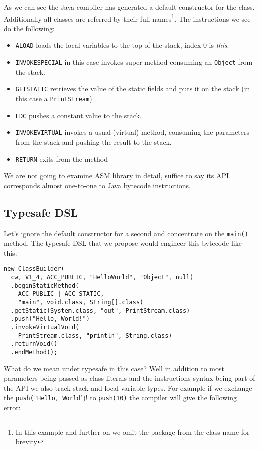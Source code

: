 \documentclass{sig-alternate}
\begin{document}
As we can see the Java compiler has generated a default constructor for the class. Additionally all classes are referred by their full names\footnote{In this example and further on we omit the package from the class name for brevity}. The instructions we see do the following:
\begin{itemize}
\item \verb!ALOAD! loads the local variables to the top of the stack, index $0$ is \emph{this}.
\item \verb!INVOKESPECIAL! in this case invokes super method consuming an \verb!Object! from the stack.
\item \verb!GETSTATIC! retrieves the value of the static fields and puts it on the stack (in this case a \verb!PrintStream!).
\item \verb!LDC! pushes a constant value to the stack.
\item \verb!INVOKEVIRTUAL! invokes a usual (virtual) method, consuming the parameters from the stack and pushing the result to the stack.
\item \verb!RETURN! exits from the method
\end{itemize}

We are not going to examine ASM library in detail, suffice to say its API corresponds almost one-to-one to Java bytecode instructions.

\subsection{Typesafe DSL}

Let's ignore the default constructor for a second and concentrate on the \verb!main()! method. The typesafe DSL that we propose would engineer this bytecode like this:

\begin{verbatim}
new ClassBuilder(
  cw, V1_4, ACC_PUBLIC, "HelloWorld", "Object", null)    
  .beginStaticMethod(
    ACC_PUBLIC | ACC_STATIC, 
    "main", void.class, String[].class)
  .getStatic(System.class, "out", PrintStream.class)
  .push("Hello, World!")
  .invokeVirtualVoid(
    PrintStream.class, "println", String.class)
  .returnVoid()
  .endMethod();
\end{verbatim}

What do we mean under typesafe in this case? Well in addition to most parameters being passed as class literals and the instructions syntax being part of the API we also track stack and local variable types. For example if we exchange the \verb!push("Hello, World!")! to \verb!push(10)! the compiler will give the following error:
\end{document}
